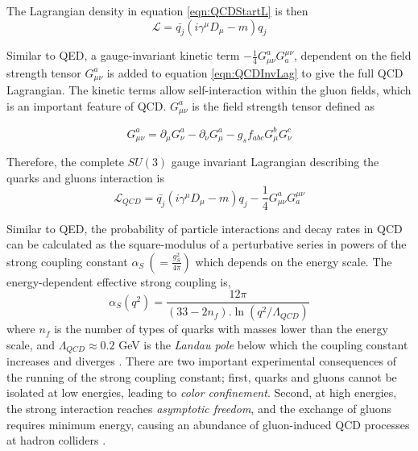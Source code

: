 The Lagrangian density in equation \ref{eqn:QCDStartL} is then 
\begin{equation}
\mathcal{L} = \bar{q_{j}}(i\gamma^{\mu}D_{\mu} - m )q_{j}
\label{eqn:QCDInvLag}
\end{equation}

Similar to QED, a gauge-invariant kinetic term $-\frac{1}{4}G^{a}_{\mu\nu}G^{\mu\nu}_{a}$, dependent on the field strength tensor $G^{a}_{\mu\nu}$ is added to equation \ref{eqn:QCDInvLag} to give the full QCD Lagrangian. The kinetic terms allow self-interaction within the gluon fields, which is an important feature of QCD. $G^{a}_{\mu\nu}$ is the field strength tensor defined as

\begin{equation}
G^{a}_{\mu\nu} = \partial_{\mu}G^{a}_{\nu} - \partial_{\nu}G^{a}_{\mu} - g_{s}f_{abc}G^{b}_{\mu}G^{c}_{\nu}
\label{eqn:QCDFullLag}
\end{equation}

Therefore, the complete $SU(3)$ gauge invariant Lagrangian describing the quarks and gluons interaction is
\begin{equation}
\mathcal{L}_{QCD} = \bar{q_{j}}(i\gamma^{\mu}D_{\mu} - m )q_{j} -\frac{1}{4}G^{a}_{\mu\nu}G^{\mu\nu}_{a} 
\label{eqn:QCDCompleteLag}
\end{equation}

Similar to QED, the probability of particle interactions and decay rates in QCD can be calculated as the square-modulus of a perturbative series in
powers of the strong coupling constant $\alpha _{S} ~(=\frac{g_{S}^2}{4\pi})$ which depends on the energy scale. The energy-dependent effective strong coupling is, 
\begin{equation}
    \alpha_{S}(q^2) = \frac{12\pi}{(33-2n_{f}).\ln(q^2/\Lambda_{QCD})}
\end{equation}
where $n_{f}$ is the number of types of quarks with masses lower than the energy scale, and $\Lambda_{QCD}\approx0.2$ GeV is the \textit{Landau pole} below which the coupling constant increases and diverges \cite{AlphaQCD}. There are two important experimental consequences of the running of the strong coupling constant; first, quarks and gluons cannot be isolated at low energies, leading to \textit{color confinement}. Second, at high energies, the strong interaction reaches \textit{asymptotic freedom}, and the exchange of gluons requires minimum energy, causing an abundance of gluon-induced QCD processes at hadron colliders \cite{AlphaQCD}. 

